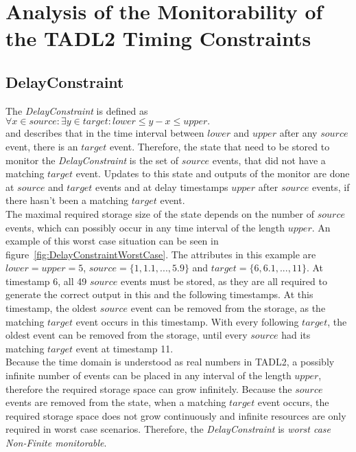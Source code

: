 \chapter{Analysis of the Monitorability of the TADL2 Timing Constraints}
\label{chapter-TADL2}

\section{DelayConstraint}
	\label{monitorability_DelayConstraint}
	The \emph{DelayConstraint} is defined as\\[10pt]
	\begin{math}
		\forall x\in source:\exists y\in target: lower\leq y-x\leq upper.
	\end{math}\\[10pt]
	and describes that in the time interval between $lower$ and $upper$ after any $source$ event, there is an $target$ event. Therefore, the state that need to be stored to monitor the \emph{DelayConstraint} is the set of $source$ events, that did not have a matching $target$ event. Updates to this state and outputs of the monitor are done at $source$ and $target$ events and at delay timestamps $upper$ after $source$ events, if there hasn't been a matching $target$ event.\\
	The maximal required storage size of the state depends on the number of $source$ events, which can possibly occur in any time interval of the length $upper$. An example of this worst case situation can be seen in figure~\ref{fig:DelayConstraintWorstCase}. The attributes in this example are $lower=upper=5$, $source=\{1, 1.1, ..., 5.9\}$ and $target=\{6, 6.1, ..., 11\}$. At timestamp 6, all 49 $source$ events must be stored, as they are all required to generate the correct output in this and the following timestamps. At this timestamp, the oldest $source$ event can be removed from the storage, as the matching $target$ event occurs in this timestamp. With every following $target$, the oldest event can be removed from the storage, until every $source$ had its matching $target$ event at timestamp 11.\\
	Because the time domain is understood as real numbers in TADL2, a possibly infinite number of events can be placed in any interval of the length $upper$, therefore the required storage space can grow infinitely. Because the $source$ events are removed from the state, when a matching $target$ event occurs, the required storage space does not grow continuously and infinite resources are only required in worst case scenarios. Therefore, the \emph{DelayConstraint} is \emph{worst case Non-Finite monitorable}.
